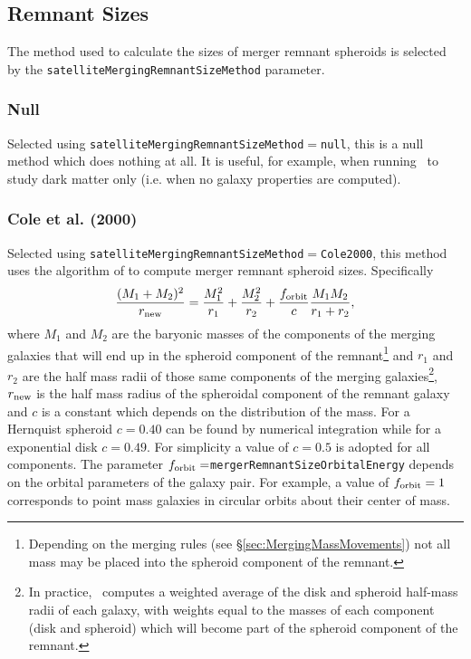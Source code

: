 \subsection{Remnant Sizes}

The method used to calculate the sizes of merger remnant spheroids is selected by the {\tt satelliteMergingRemnantSizeMethod} parameter.

\subsubsection{Null}

Selected using {\tt satelliteMergingRemnantSizeMethod}$=${\tt null}, this is a null method which does nothing at all. It is useful, for example, when running \glc\ to study dark matter only (i.e. when no galaxy properties are computed).

\subsubsection{Cole et al. (2000)}\label{sec:MergerRemnantSizeCole2000}

Selected using {\tt satelliteMergingRemnantSizeMethod}$=${\tt Cole2000}, this method uses the algorithm of \cite{cole_hierarchical_2000} to compute merger remnant spheroid sizes. Specifically
\begin{equation}
\frac{(M_1+M_2)^2}{ r_{\rm new}} =
\frac{M_1^2}{r_1} + \frac{M_2^2}{r_2} + \frac{ f_{\rm orbit}}{c}
\frac{M_1 M_2}{r_1+r_2},
\end{equation}
where $M_1$ and $M_2$ are the baryonic masses of the components of the merging galaxies that will end up in the spheroid \gls{component} of the remnant\footnote{Depending on the merging rules (see \S\protect\ref{sec:MergingMassMovements}) not all mass may be placed into the spheroid \gls{component} of the remnant.} and $r_1$ and $r_2$ are the half mass radii of those same components of the merging galaxies\footnote{In practice, \glc\ computes a weighted average of the disk and spheroid half-mass radii of each galaxy, with weights equal to the masses of each \gls{component} (disk and spheroid) which will become part of the spheroid \gls{component} of the remnant.}, $r_{\rm new}$ is the half mass radius of the spheroidal \gls{component} of the remnant galaxy and $c$ is a constant which depends on the distribution of the mass. For a Hernquist spheroid $c=0.40$ can be found by numerical integration while for a exponential disk $c=0.49$. For simplicity a value of $c=0.5$ is adopted for all components. The 
parameter $f_{\rm orbit}=${\tt mergerRemnantSizeOrbitalEnergy} depends on the orbital parameters of the galaxy pair. For example, a value of $f_{\rm orbit} = 1$ corresponds to point mass galaxies in circular orbits about their center of mass. 

